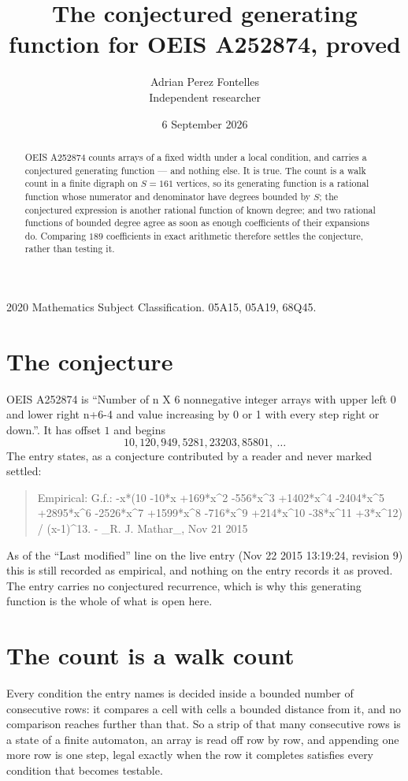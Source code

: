\documentclass[11pt,a4paper]{article}
\title{The conjectured generating function for OEIS A252874, proved}
\author{Adrian Perez Fontelles\\ \small Independent researcher}
\date{6 September 2026}
\theoremstyle{plain}
\theoremstyle{definition}
\begin{document}
\maketitle

\begin{abstract}
OEIS A252874 counts arrays of a fixed width under a local condition, and carries a conjectured
generating function --- and nothing else. It is true. The count is a walk count in a finite
digraph on $S=161$ vertices, so its generating function is a rational function whose numerator
and denominator have degrees bounded by $S$; the conjectured expression is another rational
function of known degree; and two rational functions of bounded degree agree as soon as enough
coefficients of their expansions do. Comparing $189$ coefficients in exact arithmetic
therefore settles the conjecture, rather than testing it.
\end{abstract}

\noindent\small 2020 Mathematics Subject Classification. 05A15, 05A19, 68Q45.\normalsize

\section{The conjecture}

OEIS A252874 is ``Number of n X 6 nonnegative integer arrays with upper left 0 and lower right n+6-4 and value increasing by 0 or 1 with every step right or down.''. It has offset $1$ and begins
\[
10, 120, 949, 5281, 23203, 85801,\ \dots
\]
The entry states, as a conjecture contributed by a reader and never marked settled:
\begin{quote}
Empirical: G.f.: -x*(10 -10*x +169*x\^{}2 -556*x\^{}3 +1402*x\^{}4 -2404*x\^{}5 +2895*x\^{}6 -2526*x\^{}7 +1599*x\^{}8 -716*x\^{}9 +214*x\^{}10 -38*x\^{}11 +3*x\^{}12) / (x-1)\^{}13. - \_R. J. Mathar\_, Nov 21 2015
\end{quote}
As of the ``Last modified'' line on the live entry (Nov 22 2015 13:19:24, revision 9) this is still
recorded as empirical, and nothing on the entry records it as proved. The entry carries no
conjectured recurrence, which is why this generating function is the whole of what is open
here.

\section{The count is a walk count}

Every condition the entry names is decided inside a bounded number of consecutive rows: it
compares a cell with cells a bounded distance from it, and no comparison reaches further than
that. So a strip of that many consecutive rows is a state of a finite automaton, an array is
read off row by row, and appending one more row is one step, legal exactly when the row it
completes satisfies every condition that becomes testable.
\end{document}
